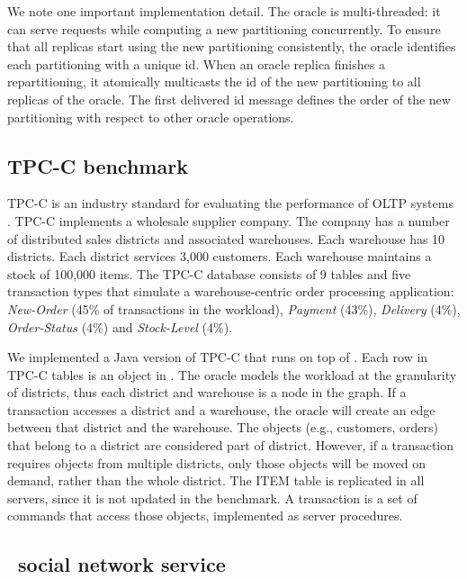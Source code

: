 We note one important implementation detail.  The oracle is multi-threaded: it
can serve requests while computing a new partitioning concurrently. To ensure
that all replicas start using the new partitioning consistently, the oracle
identifies each partitioning with a unique id.  When an oracle replica finishes
a repartitioning, it atomically multicasts the id of the new partitioning to
all replicas of the oracle.  The first delivered id message defines the order
of the new partitioning with respect to other oracle operations.


\subsection{TPC-C benchmark}
\label{sec:imp:tpcc}


TPC-C is an industry standard for evaluating the performance of OLTP systems
\cite{tpcc}. TPC-C implements a wholesale supplier company. The company has a
number of distributed sales districts and associated warehouses. Each warehouse
has 10 districts. Each district services 3,000 customers. Each warehouse
maintains a stock of 100,000 items. The TPC-C database consists of 9 tables and
five transaction types that simulate a warehouse-centric order processing
application: \emph{New-Order} (45\% of transactions in the workload),
\emph{Payment} (43\%), \emph{Delivery} (4\%), \emph{Order-Status} (4\%) and
\emph{Stock-Level} (4\%).

We implemented a Java version of TPC-C that runs on top of \dynastar. Each row
in TPC-C tables is an object in \dynastar. The oracle models the workload at the
granularity of districts, thus each district and warehouse is a node in the
graph. If a transaction accesses a district and a warehouse, the oracle will
create an edge between that district and the warehouse. The objects (e.g.,
customers, orders) that belong to a district are considered part of district.
However, if a transaction requires objects from multiple districts, only those
objects will be moved on demand, rather than the whole district. The ITEM table
is replicated in all servers, since it is not updated in the benchmark. A
transaction is a set of commands that access those objects, implemented as
server procedures.

\subsection{\dynastarappname\ social network service}
\label{sec:imp:\dynastarappname}

